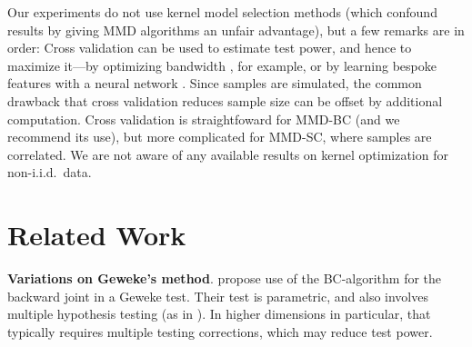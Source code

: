 \documentclass{article}
\begin{document}
Our experiments do not use kernel model selection methods (which confound results by giving MMD algorithms an unfair advantage), but a few remarks are in order: Cross validation can be used to estimate test power, and hence to maximize it---by optimizing bandwidth \citep{Gretton2012, Sutherland2017}, for example, or by learning bespoke features with a neural network \citep{Liu2020}. Since samples are simulated, the common drawback that cross validation reduces sample size can be offset by additional computation.  
Cross validation is straightfoward for MMD-BC (and we recommend its use), but more complicated for MMD-SC, where
samples are correlated. We are not aware of any available results on kernel optimization for non-i.i.d.\ data.

\section{Related Work}
\label{related:work}
 
{\noindent\bf Variations on Geweke's method}. \citet{gandy_unit_2020} propose use of the BC-algorithm for the backward joint in a Geweke test.
Their test is parametric, and also involves multiple hypothesis testing (as in \cite{geweke_getting_2004}). In higher dimensions in particular,
that typically requires multiple testing corrections, which may reduce test power.
\end{document}
